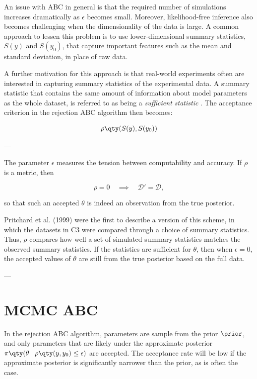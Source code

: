 An issue with ABC in general is that the required number of simulations increases dramatically as $\epsilon$ becomes small. Moreover, likelihood-free inference also becomes challenging when the dimensionality of the data is large. A common approach to lessen this problem is to use lower-dimensional summary statistics, $S(y)$ and $S(y_0)$, that capture important features such as the mean and standard deviation, in place of raw data. %

A further motivation for this approach is that real-world experiments often are interested in capturing summary statistics of the experimental data. A summary statistic that contains the same amount of information about model parameters as the whole dataset, is referred to as being a \textit{sufficient statistic} \cite{ABCprimer}. The acceptance criterion in the rejection ABC algorithm then becomes:

\begin{equation}
    \rho \qty(S(y), S(y_0))
\end{equation}


---

The parameter $\epsilon$ measures the tension between computability and accuracy. If $\rho$ is a metric, then 

\begin{equation*}
    \rho = 0 \quad \implies \quad \mathcal{D}'=\mathcal{D},
\end{equation*}

so that such an accepted $\theta$ is indeed an observation from the true posterior. 

Pritchard et al. (1999) were the first to describe a version of this scheme, in which the datasets in C3 were compared through a choice of summary statistics. Thus, $\rho$ compares how well a set of simulated summary statistics matches the observed summary statistics. If the statistics are sufficient for $\theta$, then when $\epsilon=0$, the accepted values of $\theta$ are still from the true posterior based on the full data. 

---


\section{MCMC ABC}

In the rejection ABC algorithm, parameters are sample from the prior $\prior$, and only parameters that are likely under the approximate posterior $\pi \qty(\theta \mid \rho \qty(y, y_0 ) \leq \epsilon )$ are accepted. The acceptance rate will be low if the approximate posterior is significantly narrower than the prior, as is often the case. %

